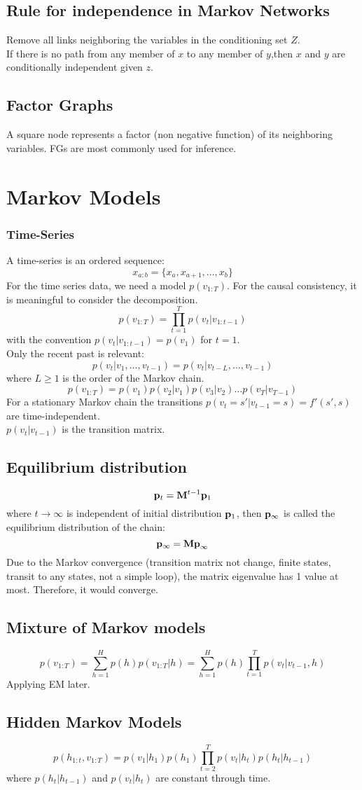 \documentclass[12pt,a4paper]{article}
\begin{document}
\subsection*{Rule for independence in Markov Networks}
Remove all links neighboring the variables in the conditioning set $Z$.\\
If there is no path from any member of $x$ to any member of $y$,then $x$ and $y$ are conditionally independent given $z$.
\subsection*{Factor Graphs}
A square node represents a factor (non negative function) of its neighboring variables. FGs are most commonly used for inference.
\section*{Markov Models}
\subsubsection*{Time-Series}
A time-series is an ordered sequence:
$$
x_{a:b}=\{x_a,x_{a+1},\ldots,x_b\}
$$
For the time series data, we need a model $p(v_{1:T})$. For the causal consistency, it is meaningful to consider the decomposition.
$$
p(v_{1:T}) = \prod_{t=1}^{T}p(v_t|v_{1:t-1})
$$
with the convention $p(v_t|v_{1:t-1}) = p(v_1)$ for $t=1$.\\
Only the recent past is relevant:
$$
p(v_t|v_1,\ldots,v_{t-1}) = p(v_t|v_{t-L},\ldots,v_{t-1})
$$
where $L\ge 1$ is the order of the Markov chain.
$$
p(v_{1:T}) = p(v_1)p(v_2|v_1)p(v_3|v_2)\ldots p(v_T|v_{T-1})
$$
For a stationary Markov chain the transitions $p(v_t=s'|v_{t-1}=s)=f'(s',s)$ are time-independent.\\
$p(v_t|v_{t-1})$ is the transition matrix.\\
\subsection*{Equilibrium distribution}
$$
{\bf p}_t = {\bf M}^{t-1}{\bf p}_1
$$
where $t\rightarrow \infty$ is independent of initial distribution ${\bf p}_1$, then ${\bf p}_{\infty}$ is called the equilibrium distribution of the chain:
$$
{\bf p}_\infty = {\bf Mp}_\infty
$$
Due to the Markov convergence (transition matrix not change, finite states, transit to any states, not a simple loop), the matrix eigenvalue has 1 value at most. Therefore, it would converge.
\subsection*{Mixture of Markov models}
$$
p(v_{1:T}) =\sum_{h=1}^{H}p(h)p(v_{1:T}|h)=\sum_{h=1}^{H}p(h)\prod_{t=1}^{T}p(v_t|v_{t-1},h)
$$
Applying EM later.
\subsection*{Hidden Markov Models}
$$
p(h_{1:t},v_{1:T}) = p(v_1|h_1)p(h_1)\prod_{t=2}^{T}p(v_t|h_t)p(h_t|h_{t-1})
$$
where $p(h_t|h_{t-1})$ and $p(v_t|h_t)$ are constant through time.
\end{document}

